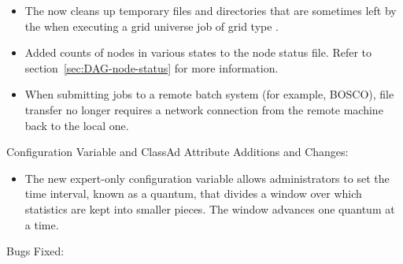 \begin{itemize}
\item The  now cleans up temporary files and directories
that are sometimes left by the  when executing a grid
universe job of grid type .

\item Added counts of nodes in various states to the 
node status file.  Refer to section~\ref{sec:DAG-node-status} for
more information.

\item When submitting jobs to a remote batch system (for example, BOSCO),
file transfer no longer requires a network connection from the remote machine
back to the local one.

\end{itemize}

\noindent Configuration Variable and ClassAd Attribute Additions and Changes:

\begin{itemize}

\item The new expert-only configuration variable 
allows administrators to set the time interval, 
known as a quantum, that divides a window over which statistics are
kept into smaller pieces.  The window advances one quantum at a time. 


\end{itemize}

\noindent Bugs Fixed:

